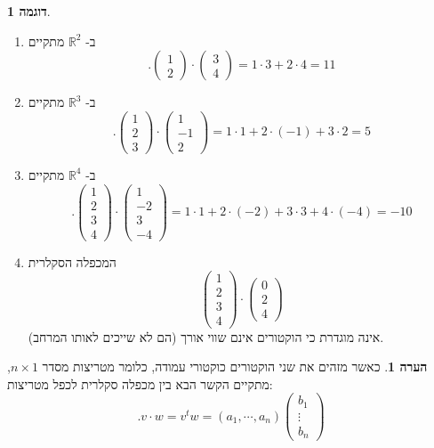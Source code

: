 \documentclass[12pt]{report}
\theoremstyle{plain}
\theoremstyle{definition}
\newtheorem{example}{דוגמה}[chapter]
\newtheorem{remark}{הערה}[chapter]
\newcommand{\R}{\mathbb{R}}
\newcommand{\0}{\mathbf{0}}
\begin{document}
\begin{example}\
\begin{enumerate}[label=\alph*.]
\item
ב-
$\R^2$
מתקיים
$$
.\begin{pmatrix}
1 \\
2
\end{pmatrix}\cdot\begin{pmatrix}
3 \\
4
\end{pmatrix}=1\cdot 3+2\cdot 4=11
$$


\item
ב-
$\R^3$
מתקיים
$$
.\begin{pmatrix}
1 \\
2 \\
3
\end{pmatrix}\cdot\begin{pmatrix}
1 \\
-1 \\
2
\end{pmatrix}=1\cdot 1+2\cdot(-1)+3\cdot 2=5
$$


\item
ב-
$\R^4$
מתקיים
$$
.\begin{pmatrix}
1 \\
2 \\
3 \\
4
\end{pmatrix}\cdot\begin{pmatrix}
1 \\
-2 \\
3 \\
-4
\end{pmatrix}=1\cdot 1+2\cdot(-2)+3\cdot 3+4\cdot(-4)=-10
$$


\item 
המכפלה הסקלרית
$$
\begin{pmatrix}
1 \\
2 \\
3 \\
4
\end{pmatrix}\cdot \begin{pmatrix}
0 \\
2 \\
4
\end{pmatrix}
$$
אינה מוגדרת כי הוקטורים אינם שווי אורך (הם לא שייכים לאותו המרחב).


\end{enumerate}
\end{example}

\begin{remark}
כאשר מזהים את שני הוקטורים כוקטורי עמודה, כלומר מטריצות מסדר 
$n\times 1$,
מתקיים הקשר הבא בין מכפלה סקלרית לכפל מטריצות:
$$
.v\cdot w=v^tw=(a_1,\cdots,a_n)\begin{pmatrix}
b_1 \\
\vdots \\
b_n
\end{pmatrix}
$$
\end{remark}
\end{document}
